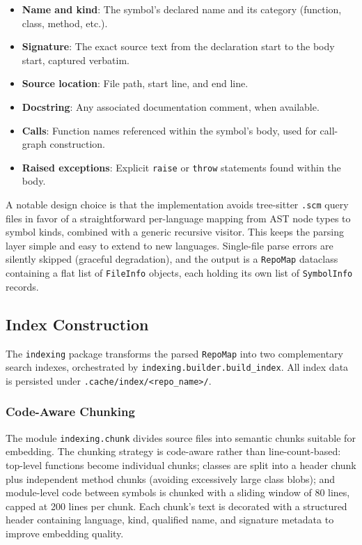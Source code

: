 \documentclass[10pt,twocolumn]{article}
\begin{document}
\begin{itemize}[nosep,leftmargin=*]
  \item \textbf{Name and kind}: The symbol's declared name and its category (function, class, method, etc.).
  \item \textbf{Signature}: The exact source text from the declaration start to the body start, captured verbatim.
  \item \textbf{Source location}: File path, start line, and end line.
  \item \textbf{Docstring}: Any associated documentation comment, when available.
  \item \textbf{Calls}: Function names referenced within the symbol's body, used for call-graph construction.
  \item \textbf{Raised exceptions}: Explicit \texttt{raise} or \texttt{throw} statements found within the body.
\end{itemize}

A notable design choice is that the implementation avoids tree-sitter \texttt{.scm} query files in favor of a straightforward per-language mapping from AST node types to symbol kinds, combined with a generic recursive visitor. This keeps the parsing layer simple and easy to extend to new languages. Single-file parse errors are silently skipped (graceful degradation), and the output is a \texttt{RepoMap} dataclass containing a flat list of \texttt{FileInfo} objects, each holding its own list of \texttt{SymbolInfo} records.

\subsection{Index Construction}

The \texttt{indexing} package transforms the parsed \texttt{RepoMap} into two complementary search indexes, orchestrated by \texttt{indexing.builder.build\_index}. All index data is persisted under \texttt{.cache/index/<repo\_name>/}.

\subsubsection{Code-Aware Chunking}
The module \texttt{indexing.chunk} divides source files into semantic chunks suitable for embedding. The chunking strategy is code-aware rather than line-count-based: top-level functions become individual chunks; classes are split into a header chunk plus independent method chunks (avoiding excessively large class blobs); and module-level code between symbols is chunked with a sliding window of 80 lines, capped at 200 lines per chunk. Each chunk's text is decorated with a structured header containing language, kind, qualified name, and signature metadata to improve embedding quality.
\end{document}
